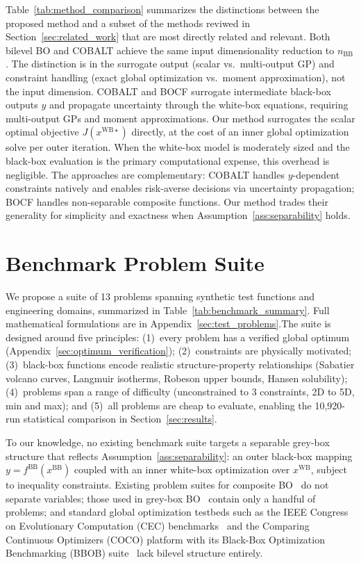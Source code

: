 \documentclass[12pt,a4paper]{article}%
\theoremstyle{plain}%
\theoremstyle{remark}%
\theoremstyle{definition}%
\def\WB{\mathrm{WB}}
\def\BB{\mathrm{BB}}
\begin{document}
Table~\ref{tab:method_comparison} summarizes the distinctions between the proposed method and a subset of the methods reviwed in Section~\ref{sec:related_work} that are most directly related and relevant. Both bilevel BO and COBALT achieve the same input dimensionality reduction to $n_{\BB}$. The distinction is in the surrogate output (scalar vs.\ multi-output GP) and constraint handling (exact global optimization vs.\ moment approximation), not the input dimension. COBALT and BOCF surrogate intermediate black-box outputs $y$ and propagate uncertainty through the white-box equations, requiring multi-output GPs and moment approximations. Our method surrogates the scalar optimal objective $J(x^{\WB\star})$ directly, at the cost of an inner global optimization solve per outer iteration. When the white-box model is moderately sized and the black-box evaluation is the primary computational expense, this overhead is negligible. The approaches are complementary: COBALT handles $y$-dependent constraints natively and enables risk-averse decisions via uncertainty propagation; BOCF handles non-separable composite functions. Our method trades their generality for simplicity and exactness when Assumption~\ref{ass:separability} holds.

\section{Benchmark Problem Suite}\label{sec:benchmark_suite}

We propose a suite of 13 problems spanning synthetic test functions and engineering domains, summarized in Table~\ref{tab:benchmark_summary}. Full mathematical formulations are in Appendix~\ref{sec:test_problems}.The suite is designed around five principles: (1)~every problem has a verified global optimum (Appendix~\ref{sec:optimum_verification}); (2)~constraints are physically motivated; (3)~black-box functions encode realistic structure-property relationships (Sabatier volcano curves, Langmuir isotherms, Robeson upper bounds, Hansen solubility); (4)~problems span a range of difficulty (unconstrained to 3 constraints, 2D to 5D, min and max); and (5)~all problems are cheap to evaluate, enabling the 10{,}920-run statistical comparison in Section~\ref{sec:results}.

To our knowledge, no existing benchmark suite targets a separable grey-box structure that reflects Assumption~\ref{ass:separability}: an outer black-box mapping $y = f^{\BB}(x^{\BB})$ coupled with an inner white-box optimization over $x^{\WB}$, subject to inequality constraints. Existing problem suites for composite BO~\cite{astudillo2019bocf} do not separate variables; those used in grey-box BO~\cite{paulson2022cobalt} contain only a handful of problems; and standard global optimization testbeds such as the IEEE Congress on Evolutionary Computation (CEC) benchmarks~\cite{suganthan2005cec} and the Comparing Continuous Optimizers (COCO) platform with its Black-Box Optimization Benchmarking (BBOB) suite~\cite{hansen2021coco} lack bilevel structure entirely. 
\end{document}
